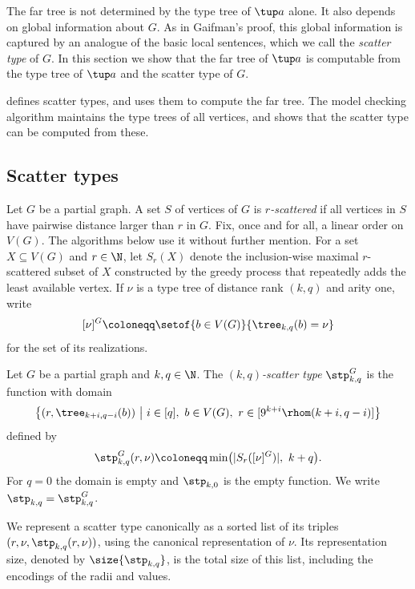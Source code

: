 The far tree is not determined by the type tree of $\tup a$ alone. It also depends on global information about $G$.
As in Gaifman's proof, this global information is captured by an analogue of the basic local sentences, which we call the \emph{scatter type} of $G$.
In this section we show that the far tree of $\tup a$ is computable from the type tree of $\tup a$ and the scatter type of $G$.

 defines scatter types, and  uses them to compute the far tree.
The model checking algorithm maintains the type trees of all vertices, and  shows that the scatter type can be computed from these.

\subsection{Scatter types}\label{sec:stp}

Let $G$ be a partial graph.
A set $S$ of vertices of $G$ is \emph{$r$-scattered} if all vertices in $S$ have pairwise distance larger than $r$ in $G$.
Fix, once and for all, a linear order on $V(G)$. The algorithms below use it without further mention.
For a set $X\subseteq V(G)$ and $r\in\N$, let $S_r(X)$ denote the inclusion-wise maximal $r$-scattered subset of $X$ constructed by the greedy process that repeatedly adds the least available vertex.
If $\nu$ is a type tree of distance rank $(k,q)$ and arity one, write
\[
[\nu]^G
\coloneqq
\setof{b\in V(G)}{\tree_{k,q}(b)=\nu}
\]
for the set of its realizations.

\begin{definition}\label{def:stp}
Let $G$ be a partial graph and $k,q\in\N$. The \emph{$(k,q)$-scatter type} $\stp_{k,q}^G$ is the function  with domain
\begin{align*}
\bigl\{(r,\tree_{k+i,q-i}(b))\ \big|\
i\in[q],\ b\in V(G),\ r\in[9^{k+i}\rhom(k+i,q-i)]\bigr\}
\end{align*}
defined by
\[
\stp^G_{k,q}(r,\nu)
\coloneqq
\min\bigl(|S_r([\nu]^G)|,\ k+q\bigr).
\]
For $q=0$ the domain is empty and $\stp_{k,0}$ is the empty function. We write $\stp_{k,q}=\stp^{G}_{k,q}$.
\end{definition}

We represent a scatter type canonically as a sorted list of its triples
$(r,\nu,\stp_{k,q}(r,\nu))$, using the canonical representation of $\nu$.
Its representation size, denoted by $\size{\stp_{k,q}}$, is the total size of
this list, including the encodings of the radii and values.

